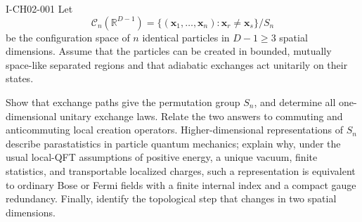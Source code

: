 \begin{exercise}{I-CH02-001}
Let
\[
  \mathcal C_n(\mathbb R^{D-1})
  =\{(\mathbf x_1,\ldots,\mathbf x_n):\mathbf x_r\ne\mathbf x_s\}/S_n
\]
be the configuration space of $n$ identical particles in $D-1\geq3$ spatial
dimensions. Assume that the particles can be created in bounded, mutually
space-like separated regions and that adiabatic exchanges act unitarily on
their states.

Show that exchange paths give the permutation group $S_n$, and determine all
one-dimensional unitary exchange laws. Relate the two answers to commuting and
anticommuting local creation operators. Higher-dimensional representations of
$S_n$ describe parastatistics in particle quantum mechanics; explain why, under
the usual local-QFT assumptions of positive energy, a unique vacuum, finite
statistics, and transportable localized charges, such a representation is
equivalent to ordinary Bose or Fermi fields with a finite internal index and a
compact gauge redundancy. Finally, identify the topological step that changes
in two spatial dimensions.
\end{exercise}
